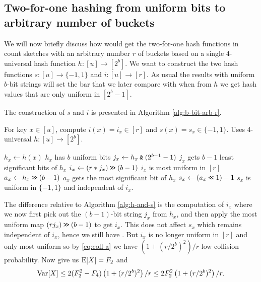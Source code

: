 \subsection{Two-for-one hashing from uniform bits to arbitrary number of buckets}
We will now briefly discuss how would get the two-for-one hash
functions in count sketches with an arbitrary number $r$ of buckets based
on a single $4$-universal hash function $h:[u]\to [2^b]$.  We want to
construct the two hash functions $s:[u]\to\{-1,1\}$ and
$i:[u]\to[r]$. As usual the results with uniform $b$-bit strings will
set the bar that we later compare with when from $h$ we get hash values that
are only uniform in $[2^b-1]$.

The construction of $s$ and $i$ is presented in 
Algorithm \ref{alg:b-bit-arb-r}.
\begin{algorithm}[H]
   \caption{For key $x\in [u]$, compute $i(x)=i_x\in[r]$ and $s(x)=s_x\in\{-1,1\}$.
   \newline
    Uses 4-universal $h:[u]\to [2^b]$.}
   \label{alg:b-bit-arb-r}
   \begin{algorithmic}
      \State $h_x\gets h(x)$
      \Comment $h_x$ has $b$ uniform bits
      \State $j_x\gets h_x\mathbin{\texttt{\&}}(2^{b-1}-1)$
      \Comment $j_x$ gets $b-1$ least significant bits of $h_x$
      \State $i_x\gets (r*j_x)\mathbin{\texttt{>\!>}} (b-1)$
      \Comment $i_x$ is most uniform in $[r]$
      \State $a_x\gets h_x\mathbin{\texttt{>\!>}} (b-1)$
      \Comment $a_x$ gets the most significant bit of $h_x$
      \State $s_x\gets (a_x\mathbin{\texttt{<\!<}} 1)-1$
      \Comment $s_x$ is uniform in $\{-1,1\}$ and independent of $i_x$.
   \end{algorithmic}
\end{algorithm}
The difference relative to Algorithm \ref{alg:h-and-s} is the computation
of $i_x$ where we now first pick out the $(b-1)$-bit string $j_x$ from
$h_x$, and then apply the most uniform map $(rj_x)\mathbin{\texttt{>\!>}} (b-1)$
to get $i_x$. This does not affect $s_x$ which remains independent
of $i_x$, hence we still have .
But $i_x$ is no longer uniform in $[r]$ and only most uniform
so by \eqref{eq:coll-a} we have $(1 + (r/2^b)^2)/r$-low collision probability.
Now  give us $\operatorname*{E}[X] = F_2$ and
\begin{equation}\label{eq:Var-b-bit-arb-r}
   \operatorname*{Var}[X] \le 2(F_2^2 - F_4)\left(1+(r/2^b)^2\right)/r
      \le 2 F_2^2\left(1 + (r/2^b)^2 \right)/r .
\end{equation}

